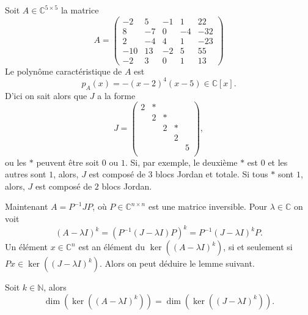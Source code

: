 \begin{example}
  \label{exe:52}

  Soit $A ∈ ℂ^{5 ×5}$ la matrice
  \begin{displaymath}
    A =  \left(\begin{array}{rrrrr}
-2 & 5 & -1 & 1 & 22 \\
8 & -7 & 0 & -4 & -32 \\
2 & -4 & 4 & 1 & -23 \\
-10 & 13 & -2 & 5 & 55 \\
-2 & 3 & 0 & 1 & 13
\end{array}\right)
\end{displaymath}
%
Le polynôme caractéristique de $A$ est
\begin{displaymath}
  p_A(x) = - (x-2)^4 (x-5) ∈ℂ[x]. 
\end{displaymath}
%
D'ici on sait alors que $J$ a la forme
\begin{displaymath}
  J =
  \begin{pmatrix}
    2 & *  \\
    & 2 & * \\
    & & 2 & * \\
    & & & 2   \\
    & & & & 5 \\
  \end{pmatrix}, 
\end{displaymath}
ou les $*$ peuvent être soit $0$ ou $1$. Si, par exemple, le deuxième $*$ est $0$ et les autres sont $1$, alors, $J$ est composé de $3$ blocs Jordan et totale. Si tous $*$ sont $1$, alors, $J$ est composé de $2$ blocs Jordan. 
\end{example}

Maintenant $A = P^{-1} J P$, où $P ∈ℂ^{n×n}$ est une matrice inversible.  Pour $λ ∈ ℂ$ on voit
\begin{displaymath}
  (A - λI)^k =  \left (P^{-1} (J - λ I) P \right)^k = P^{-1} (J - λ I)^k  P. 
\end{displaymath}
Un élément $x ∈ℂ^n$ est an élément du $\ker \left((A - λI)^k\right)$, si et seulement si $P x ∈ \ker \left((J - λI)^k\right)$. Alors on peut déduire le lemme suivant.
\begin{lemma}
  \label{lem:28}
  Soit $k ∈ ℕ$, alors
  \begin{displaymath}
     \dim(\ker \left((A - λI)^k \right)) = \dim(\ker \left((J- λI)^k \right)). 
  \end{displaymath}
\end{lemma}

